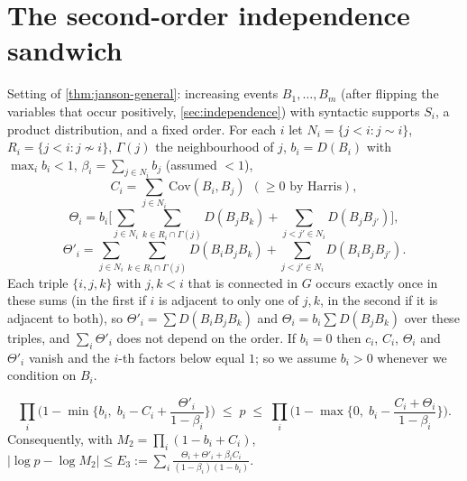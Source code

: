 \appendix

\section{The second-order independence sandwich}\label{app:second-order}

Setting of \cref{thm:janson-general}: increasing events $B_1,\dots,B_m$ (after
flipping the variables that occur positively, \cref{sec:independence}) with syntactic
supports $S_i$, a product distribution, and a fixed order. For each $i$ let
$N_i=\{j<i:j\sim i\}$, $R_i=\{j<i:j\not\sim i\}$, $\Gamma(j)$ the neighbourhood of $j$,
$b_i=D(B_i)$ with $\max_ib_i<1$, $\beta_i=\sum_{j\in N_i}b_j$ (assumed $<1$),
\[
C_i=\sum_{j\in N_i}\mathrm{Cov}(B_i,B_j)\ \ (\ge0\text{ by Harris}),
\]
\[
\Theta_i=b_i\Big[\sum_{j\in N_i}\sum_{k\in R_i\cap\Gamma(j)}D(B_jB_k)+\sum_{j<j'\in N_i}D(B_jB_{j'})\Big],
\]
\[
\Theta'_i=\sum_{j\in N_i}\sum_{k\in R_i\cap\Gamma(j)}D(B_iB_jB_k)+\sum_{j<j'\in N_i}D(B_iB_jB_{j'}).
\]
Each triple $\{i,j,k\}$ with $j,k<i$ that is connected in $G$ occurs exactly once in
these sums (in the first if $i$ is adjacent to only one of $j,k$, in the second if it
is adjacent to both), so $\Theta'_i=\sum D(B_iB_jB_k)$ and $\Theta_i=b_i\sum D(B_jB_k)$
over these triples, and $\sum_i\Theta'_i$ does not depend on the order. If $b_i=0$
then $c_i$, $C_i$, $\Theta_i$ and $\Theta'_i$ vanish and the $i$-th factors below equal $1$;
so we assume $b_i>0$ whenever we condition on $B_i$.

\begin{theorem}\label{thm:second-order}
\[
\prod_i\Big(1-\min\Big\{b_i,\;b_i-C_i+\frac{\Theta'_i}{1-\beta_i}\Big\}\Big)\;\le\;p\;\le\;
\prod_i\Big(1-\max\Big\{0,\;b_i-\frac{C_i+\Theta_i}{1-\beta_i}\Big\}\Big).
\]
Consequently, with $M_2=\prod_i(1-b_i+C_i)$,
$|\log p-\log M_2|\le E_3:=\sum_i\frac{\Theta_i+\Theta'_i+\beta_iC_i}{(1-\beta_i)(1-b_i)}$.
\end{theorem}


